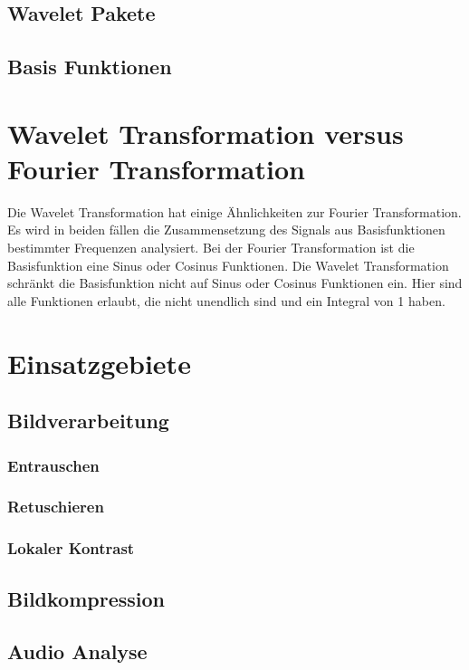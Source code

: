 \documentclass[12pt, a4paper, ngerman]{article}
\begin{document}
\subsection{Wavelet Pakete}
\subsection{Basis Funktionen}
\label{sec:basis_functions}

\section{Wavelet Transformation versus Fourier Transformation}

Die Wavelet Transformation hat einige Ähnlichkeiten zur Fourier Transformation.
Es wird in beiden fällen die Zusammensetzung des Signals aus Basisfunktionen bestimmter Frequenzen analysiert.
Bei der Fourier Transformation ist die Basisfunktion eine Sinus oder Cosinus Funktionen.
Die Wavelet Transformation schränkt die Basisfunktion nicht auf Sinus oder Cosinus Funktionen ein.
Hier sind alle Funktionen erlaubt, die nicht unendlich sind und ein Integral von 1 haben.

\section{Einsatzgebiete}
\subsection{Bildverarbeitung}
\subsubsection{Entrauschen}
\subsubsection{Retuschieren}
\subsubsection{Lokaler Kontrast}
\subsection{Bildkompression}
\subsection{Audio Analyse}

\newpage
\printbibliography
\end{document}

